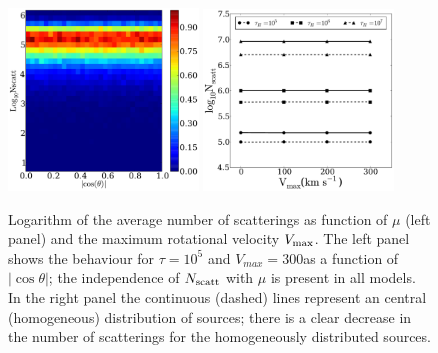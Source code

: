 \documentclass{emulateapj}
\newcommand{\kms}{{\ifmmode{{\mathrm{\,km\ s}^{-1}}}\else{\,km~s$^{-1}$}\fi}}
\begin{document}
\begin{figure}
\begin{center}
    \includegraphics[width=0.45\textwidth]{f12.pdf}
    \includegraphics[width=0.45\textwidth]{f13.pdf}
\end{center}
\caption{Logarithm of the average number of scatterings as function of
  $\mu$ (left panel) and the maximum rotational velocity $V_{\rm
max}$. The left panel shows the behaviour for $\tau=10^{5}$ and
  $V_{max}=300$\kms as a function of $|\cos\theta|$; the independence of
  $N_{\rm scatt}$ with $\mu$ is present in all models.
  In the right panel the continuous (dashed) lines represent an
  central (homogeneous) distribution of sources; there is a clear
  decrease in the number of scatterings for the homogeneously
  distributed sources.
\label{fig:Nscatt} }
\end{figure}



\end{document}
